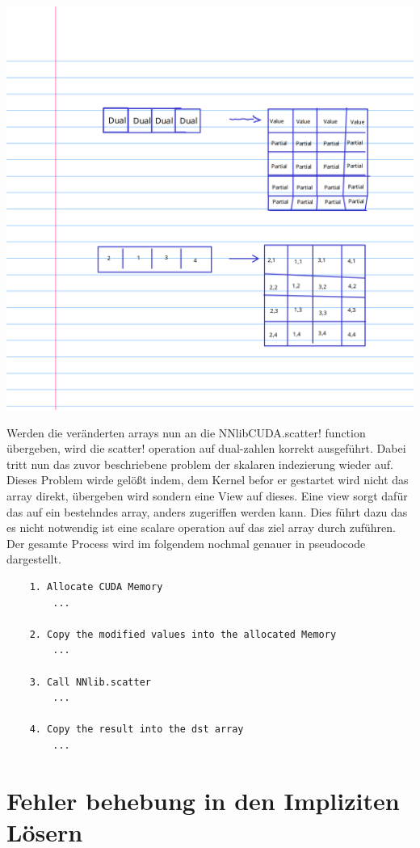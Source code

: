 \includegraphics[width=\textwidth]{Data/02_Versuch/cropted.png}

Werden die veränderten arrays nun an die NNlibCUDA.scatter! function übergeben,
wird die scatter! operation auf dual-zahlen korrekt ausgeführt.
Dabei tritt nun das zuvor beschriebene problem der skalaren indezierung wieder auf.
Dieses Problem wirde gelößt indem, dem Kernel befor er gestartet wird nicht das array direkt, übergeben wird
sondern eine View auf dieses.
Eine view sorgt dafür das auf ein bestehndes array, anders zugeriffen werden kann.
Dies führt dazu das es nicht notwendig ist eine scalare operation auf das ziel array durch zuführen.
Der gesamte Process wird im folgendem nochmal genauer in pseudocode dargestellt.

\begin{verbatim}
	1. Allocate CUDA Memory 
		...		
		
	2. Copy the modified values into the allocated Memory
		...
		
	3. Call NNlib.scatter
		...
		
	4. Copy the result into the dst array
		...
\end{verbatim}


\section{ Fehler behebung in den Impliziten Lösern }

